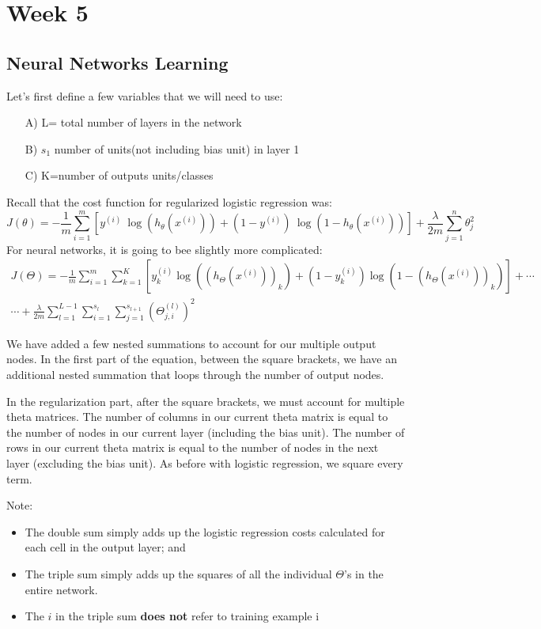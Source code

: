 \chapter{Week 5}
\section{Neural Networks Learning}
Let's first define a few variables that we will need to use:
\begin{itemize}
	\item[A)] L= total number of layers in the network
	\item[B)] $s_1$ number of units(not including bias unit) in layer 1
	\item[C)] K=number of outputs units/classes
\end{itemize}
Recall that the cost function for regularized logistic regression was:
\begin{equation}
J(\theta) = - \frac{1}{m} \sum_{i=1}^m \left[ y^{(i)}\ \log \left(h_\theta (x^{(i)})\right) + (1 - y^{(i)})\ \log \left(1 - h_\theta(x^{(i)})\right)\right] + \frac{\lambda}{2m}\sum_{j=1}^n \theta_j^2
\end{equation}
For neural  networks, it is going to bee slightly more complicated:
\begin{multline}
J(\Theta) = - \frac{1}{m} \sum_{i=1}^m \sum_{k=1}^K \left[y^{(i)}_k \log ((h_\Theta (x^{(i)}))_k) + (1 - y^{(i)}_k)\log (1 - (h_\Theta(x^{(i)}))_k)\right] + \cdots \\
\cdots + \frac{\lambda}{2m}\sum_{l=1}^{L-1} \sum_{i=1}^{s_l} \sum_{j=1}^{s_{l+1}} ( \Theta_{j,i}^{(l)})^2
\end{multline}

We have added a few nested summations to account for our multiple output nodes. In the first part of the equation, between the square brackets, we have an additional nested summation that loops through the number of output nodes.

In the regularization part, after the square brackets, we must account for multiple theta matrices. The number of columns in our current theta matrix is equal to the number of nodes in our current layer (including the bias unit). The number of rows in our current theta matrix is equal to the number of nodes in the next layer (excluding the bias unit). As before with logistic regression, we square every term.

Note:
\begin{itemize}
	\item The double sum simply adds up the logistic regression costs calculated for each cell in the output layer; and 
	\item The triple sum simply adds up the squares of all the individual $\Theta$'s in the entire network.
	\item The $i$ in the triple sum \textbf{does not} refer to training example i
\end{itemize}


